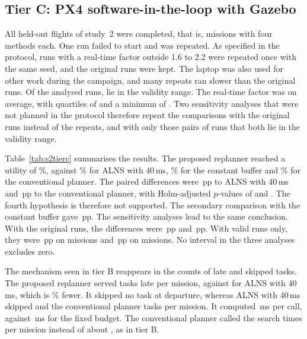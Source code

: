 \subsection{Tier C: PX4 software-in-the-loop with Gazebo}\label{sec:Ss2-tierc}
All  held-out flights of study~2 were completed, that is,  missions with four methods each. One run
failed to start and was repeated. As specified in the protocol,  runs with a real-time factor outside
1.6 to 2.2 were repeated once with the same seed, and the original runs were kept. The laptop was also used for other
work during the campaign, and many repeats ran slower than the original runs. Of the  analysed runs,
 lie in the validity range. The real-time factor was  on average, with quartiles of
 and a minimum of . Two sensitivity analyses that were not planned in the protocol therefore repeat the
comparisons with the original runs instead of the repeats, and with only those pairs of runs that both lie in the
validity range.

Table~\ref{tab:s2tierc} summarises the results. The proposed replanner reached a utility of \%, against
\% for ALNS with 40\,ms, \% for the constant buffer and \% for the conventional
planner. The paired differences were \,pp to ALNS with 40\,ms and \,pp to the conventional
planner, with Holm-adjusted $p$-values of  and . The fourth hypothesis is therefore not
supported. The secondary comparison with the constant buffer gave \,pp. The sensitivity analyses lead to
the same conclusion. With the original runs, the differences were \,pp and \,pp.
With valid runs only, they were \,pp on  missions and \,pp on
 missions. No interval in the three analyses excludes zero.


The mechanism seen in tier B reappears in the counts of late and skipped tasks. The proposed replanner served
 tasks late per mission, against  for ALNS with 40\,ms, which is \%
fewer. It skipped no task at departure, whereas ALNS with 40\,ms skipped  and the conventional planner
 tasks per mission. It computed \,ms per call, against \,ms for the fixed
budget. The conventional planner called the search  times per mission instead of about
, as in tier B.


